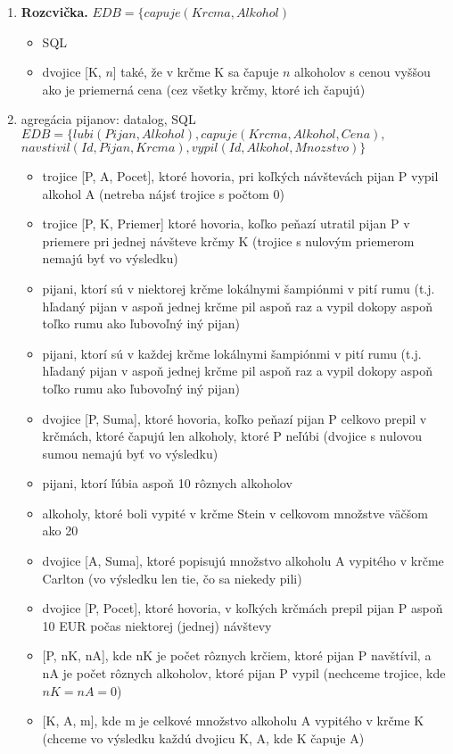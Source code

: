 \documentclass[10pt, a4paper]{article}
\begin{document}
\begin{enumerate}
\item {\bf Rozcvička.} $EDB=\{capuje(Krcma, Alkohol)$
\begin{itemize}
    \item SQL
    \item dvojice [K, $n$] také, že v krčme K sa čapuje $n$ alkoholov s cenou vyššou ako je priemerná cena (cez všetky krčmy, ktoré ich čapujú)
\end{itemize}

\item agregácia pijanov: datalog, SQL
$EDB=\{lubi(Pijan, Alkohol), capuje(Krcma, Alkohol, Cena),$\\
\hspace*{1cm} $navstivil(Id, Pijan, Krcma), vypil(Id, Alkohol, Mnozstvo)\}$
\begin{itemize}
    \item trojice [P, A, Pocet], ktoré hovoria, pri koľkých návštevách pijan P vypil alkohol A (netreba nájsť trojice s počtom 0)
    \item trojice [P, K, Priemer] ktoré hovoria, koľko peňazí utratil pijan P v priemere pri jednej návšteve krčmy K (trojice s nulovým priemerom nemajú byť vo výsledku)
    \item pijani, ktorí sú v niektorej krčme lokálnymi šampiónmi v pití rumu (t.j. hľadaný pijan v aspoň jednej krčme pil aspoň raz a vypil dokopy aspoň toľko rumu ako ľubovoľný iný pijan)
    \item pijani, ktorí sú v každej krčme lokálnymi šampiónmi v pití rumu (t.j. hľadaný pijan v aspoň jednej krčme pil aspoň raz a vypil dokopy aspoň toľko rumu ako ľubovoľný iný pijan)
    \item dvojice [P, Suma], ktoré hovoria, koľko peňazí pijan P celkovo prepil v krčmách, ktoré čapujú len alkoholy, ktoré P neľúbi (dvojice s nulovou sumou nemajú byť vo výsledku)

    
    \item pijani, ktorí ľúbia aspoň 10 rôznych alkoholov
    \item alkoholy, ktoré boli vypité v krčme Stein v celkovom množstve väčšom ako 20
    \item dvojice [A, Suma], ktoré popisujú množstvo alkoholu A vypitého v krčme Carlton (vo výsledku len tie, čo sa niekedy pili)
    \item dvojice [P, Pocet], ktoré hovoria, v koľkých krčmách prepil pijan P aspoň 10 EUR počas niektorej (jednej) návštevy
    \item{} [P, nK, nA], kde nK je počet rôznych krčiem, ktoré pijan P navštívil, a nA je počet rôznych alkoholov, ktoré pijan P vypil (nechceme trojice, kde $nK=nA=0$) 
    \item{} [K, A, m], kde m je celkové množstvo alkoholu A vypitého v krčme K (chceme vo výsledku každú dvojicu K, A, kde K čapuje A)
\end{itemize}


\end{enumerate}
\end{document}
